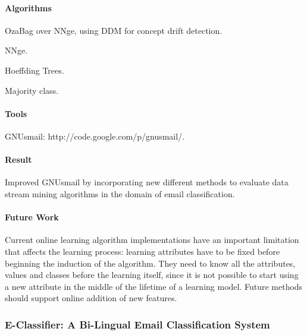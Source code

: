 \documentclass[12pt]{article}
\newenvironment{my_itemize}
{\begin{itemize}
  \setlength{\itemsep}{0cm}
  \setlength{\parskip}{0cm}}
{\end{itemize}}
\begin{document}
\paragraph{Algorithms}
\begin{my_itemize}
    \item OzaBag over NNge, using DDM for concept drift detection.
    \item NNge.
    \item Hoeffding Trees.
    \item Majority class.
\end{my_itemize}

\paragraph{Tools}
\begin{my_itemize}
    \item GNUsmail: http://code.google.com/p/gnusmail/.
\end{my_itemize}

\paragraph{Result}
\begin{my_itemize}
  \item Improved GNUsmail by incorporating new different methods to evaluate 
	data stream mining algorithms in the domain of email classification.
\end{my_itemize}

\paragraph{Future Work}
\begin{my_itemize}
  \item Current online learning algorithm implementations have an important 
	limitation that affects the learning process: learning attributes have 
	to be fixed before beginning the induction of the algorithm. They need 
	to know all the attributes, values and classes before the learning itself, 
	since it is not possible to start using a new attribute in the middle of the 
	lifetime of a learning model. Future methods should support online addition of
	new features.
\end{my_itemize}


\subsubsection{E-Classifier: A Bi-Lingual Email Classification System \cite{NOUF08}}
\end{document}
